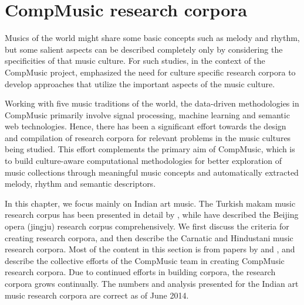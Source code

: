 \section{CompMusic research corpora}\label{sec:cmcorpora}
Musics of the world might share some basic concepts such as melody and rhythm, but some salient aspects can be described completely only by considering the specificities of that music culture. For such studies, in the context of the CompMusic project,  emphasized the need for culture specific research corpora to develop approaches that utilize the important aspects of the music culture. 

Working with five music traditions of the world, the data-driven methodologies in CompMusic primarily involve signal processing, machine learning and semantic web technologies. Hence, there has been a significant effort towards the design and compilation of research corpora for relevant problems in the music cultures being studied. This effort complements the primary aim of CompMusic, which is to build culture-aware computational methodologies for better exploration of music collections through meaningful music concepts and automatically extracted melody, rhythm and semantic descriptors. 

In this chapter, we focus mainly on Indian art music. The Turkish makam music research corpus has been presented in detail by , while  have described the Beijing opera (\gls{jingju}) research corpus comprehensively. We first discuss the criteria for creating research corpora, and then describe the Carnatic and Hindustani music research corpora. Most of the content in this section is from papers by  and , and describe the collective efforts of the CompMusic team in creating CompMusic research corpora. Due to continued efforts in building corpora, the research corpora grows continually. The numbers and analysis presented for the Indian art music research corpora are correct as of June 2014. 
